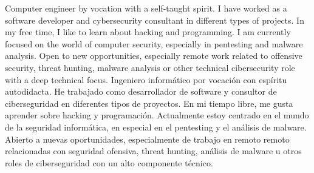 	{}
	{}


\begin{cvparagraph}

	{
		Computer engineer by vocation with a self-taught spirit. I have worked as a software developer and cybersecurity consultant in different types of projects. In my free time, I like to learn about hacking and programming. I am currently focused on the world of computer security, especially in pentesting and malware analysis. Open to new opportunities, especially remote work related to offensive security, threat hunting, malware analysis or other technical cibersecurity role with a deep technical focus.
	}
	{
		Ingeniero informático por vocación con espíritu autodidacta. He trabajado como desarrollador de software y consultor de ciberseguridad en diferentes tipos de proyectos. En mi tiempo libre, me gusta aprender sobre hacking y programación. Actualmente estoy centrado en el mundo de la seguridad informática, en especial en el pentesting y el análisis de malware. Abierto a nuevas oportunidades, especialmente de trabajo en remoto remoto relacionadas con seguridad ofensiva, threat hunting, análisis de malware u otros roles de ciberseguridad con un alto componente técnico.
	}

\end{cvparagraph}
